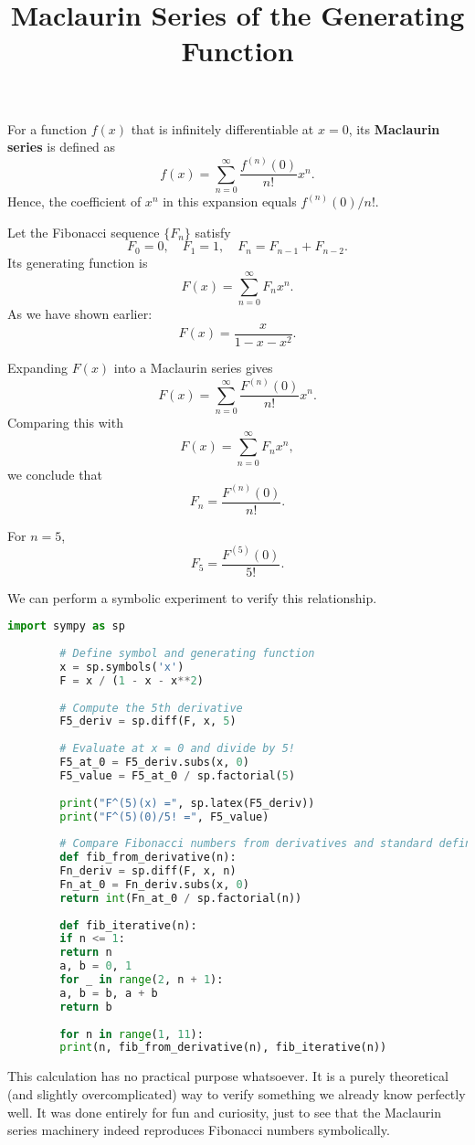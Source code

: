 \documentclass[a4paper,12pt]{article}
\title{Maclaurin Series of the Generating Function}
\author{}
\date{}
\begin{document}
	\maketitle
	
	For a function \( f(x) \) that is infinitely differentiable at \( x=0 \),
	its \textbf{Maclaurin series} is defined as
	\[
	f(x) = \sum_{n=0}^{\infty} \frac{f^{(n)}(0)}{n!} x^n.
	\]
	Hence, the coefficient of \(x^n\) in this expansion equals \( f^{(n)}(0)/n! \).
	
	Let the Fibonacci sequence \(\{F_n\}\) satisfy
	\[
	F_0 = 0, \quad F_1 = 1, \quad F_{n} = F_{n-1} + F_{n-2}.
	\]
	Its generating function is
	\[
	F(x) = \sum_{n=0}^{\infty} F_n x^n.
	\]
	As we have shown earlier:
	\[
	F(x) = \frac{x}{1 - x - x^2}.
	\]
	
	Expanding \(F(x)\) into a Maclaurin series gives
	\[
	F(x) = \sum_{n=0}^{\infty} \frac{F^{(n)}(0)}{n!} x^n.
	\]
	Comparing this with
	\[
	F(x) = \sum_{n=0}^{\infty} F_n x^n,
	\]
	we conclude that
	\[
	F_n = \frac{F^{(n)}(0)}{n!}.
	\]
	
	For \( n = 5 \),
	\[
	F_5 = \frac{F^{(5)}(0)}{5!}.
	\]
	
	We can perform a symbolic experiment to verify this relationship.
	
	\begin{lstlisting}[language=Python, caption={Symbolic verification in Python (SymPy)}]
		import sympy as sp
		
		# Define symbol and generating function
		x = sp.symbols('x')
		F = x / (1 - x - x**2)
		
		# Compute the 5th derivative
		F5_deriv = sp.diff(F, x, 5)
		
		# Evaluate at x = 0 and divide by 5!
		F5_at_0 = F5_deriv.subs(x, 0)
		F5_value = F5_at_0 / sp.factorial(5)
		
		print("F^(5)(x) =", sp.latex(F5_deriv))
		print("F^(5)(0)/5! =", F5_value)
		
		# Compare Fibonacci numbers from derivatives and standard definition
		def fib_from_derivative(n):
		Fn_deriv = sp.diff(F, x, n)
		Fn_at_0 = Fn_deriv.subs(x, 0)
		return int(Fn_at_0 / sp.factorial(n))
		
		def fib_iterative(n):
		if n <= 1:
		return n
		a, b = 0, 1
		for _ in range(2, n + 1):
		a, b = b, a + b
		return b
		
		for n in range(1, 11):
		print(n, fib_from_derivative(n), fib_iterative(n))
	\end{lstlisting}


This calculation has no practical purpose whatsoever.  
It is a purely theoretical (and slightly overcomplicated) way to verify something we already know perfectly well.  
It was done entirely for fun and curiosity, just to see that the Maclaurin series machinery indeed reproduces Fibonacci numbers symbolically.
	
\end{document}
